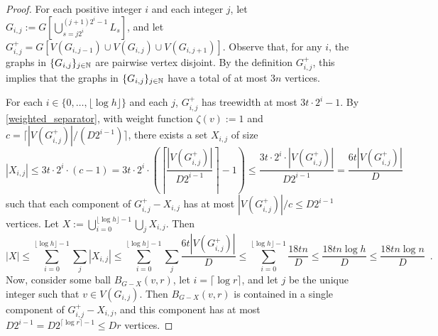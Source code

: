 \documentclass{patmorin}
\renewcommand{\le}{\leqslant}
\begin{document}
\begin{proof}
 For each positive integer $i$ and each integer $j$, let $G_{i,j}:=G[\bigcup_{s=j2^i}^{(j+1)2^i-1} L_s]$,  and let $G^+_{i,j}=G[V(G_{i,j-1})\cup V(G_{i,j})\cup V(G_{i,j+1})]$.  Observe that, for any $i$, the graphs in $\{ G_{i,j}\}_{j\in\mathbb{N}}$ are pairwise vertex disjoint.  By the definition $G^+_{i,j}$, this implies that the graphs in $\{ G_{i,j}\}_{j\in\mathbb{N}}$ have a total of at most $3n$ vertices.

 For each $i\in\{0,\ldots,\lfloor \log h\rfloor\}$ and each $j$, $G^+_{i,j}$ has treewidth at most $3t\cdot 2^i-1$.  By \cref{weighted_separator}, with weight function $\zeta(v):=1$ and $c=\lceil |V(G^+_{i,j})|/(D2^{i-1})\rceil$, there exists a set $X_{i,j}$ of size
 \[
    |X_{i,j}|\le 3t\cdot 2^i\cdot(c-1) =
    3t\cdot 2^i\cdot\left(\left\lceil\frac{ |V(G^+_{i,j})|}{D2^{i-1}}\right\rceil-1\right) \le
    \frac{3t\cdot 2^i\cdot|V(G^+_{i,j})|}{ D2^{i-1}}
    = \frac{6t|V(G^+_{i,j})|}{D}
 \]
 such that each component of $G^+_{i,j}-X_{i,j}$ has at most $|V(G^+_{i,j})|/c \le D2^{i-1}$ vertices.  Let $X:=\bigcup_{i=0}^{\lfloor\log h\rfloor-1}\bigcup_{j}X_{i,j}$.  Then
 \[
    |X| \le
    \sum_{i=0}^{\lfloor\log h\rfloor-1}\sum_{j} |X_{i,j}|
    \le
    \sum_{i=0}^{\lfloor\log h\rfloor-1}\sum_{j} \frac{6t|V(G^+_{i,j})|}{D}
    \le
    \sum_{i=0}^{\lfloor\log h\rfloor-1}\frac{18tn}{D}
    \le \frac{18tn\log h}{D}\le\frac{18tn\log n}{D}
    \enspace .
 \]
 Now, consider some ball $B_{G-X}(v,r)$, let $i=\lceil\log r\rceil$, and let $j$ be the unique integer such that $v\in V(G_{i,j})$.  Then $B_{G-X}(v,r)$ is contained in a single component of $G^+_{i,j}-X_{i,j}$, and this component has at most $D2^{i-1}=D2^{\lceil\log r\rceil-1}\le Dr$ vertices.
\end{proof}




\end{document}
